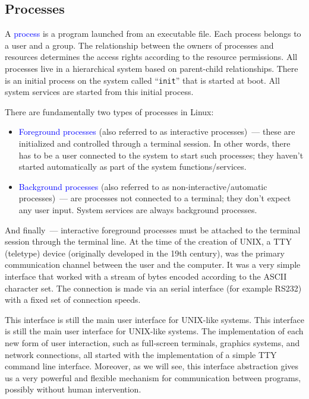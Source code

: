 \documentclass[12pt]{report}
\newcommand{\struct}[1]{\textcolor{blue}{#1}}
\begin{document}
\subsection*{Processes}

\medskip
A \struct{process} is a program launched from an executable file. Each process
belongs to a user and a group. The relationship between the owners of
processes and resources determines the access rights according to the
resource permissions. All processes live in a hierarchical system based
on parent-child relationships. There is an initial process on the system
called ``\verb|init|'' that is started at boot. All system services are started
from this initial process.

\medskip
There are fundamentally two types of processes in Linux:%
\begin{itemize}
\item \struct{Foreground processes} (also referred to as interactive processes)~---
      these are initialized and controlled through a terminal session.
      In other words, there has to be a user connected to the system to start
      such processes; they haven’t started automatically as part of the system
      functions/services.
\item \struct{Background processes} (also referred to as non-interactive/automatic
      processes)~--- are processes not connected to a terminal; they don't
      expect any user input. System services are always background processes.
\end{itemize}

\medskip
And finally~--- interactive foreground processes must be attached to
the terminal session through the terminal line. At the time of the creation of
UNIX, a TTY (teletype) device (originally developed in the 19th century),
was the primary communication channel between the user and the computer.
It was a very simple interface that worked with a stream of bytes encoded
according to the ASCII character set. The connection is made via an serial
interface (for example RS232) with a fixed set of connection speeds.

\medskip
This interface is still the main user interface for UNIX-like systems.
This interface is still the main user interface for UNIX-like systems.
The implementation of each new form of user interaction, such as
full-screen terminals, graphics systems, and network connections, all
started with the implementation of a simple TTY command line interface.
Moreover, as we will see, this interface abstraction gives us a very
powerful and flexible mechanism for communication between programs,
possibly without human intervention.
\end{document}
